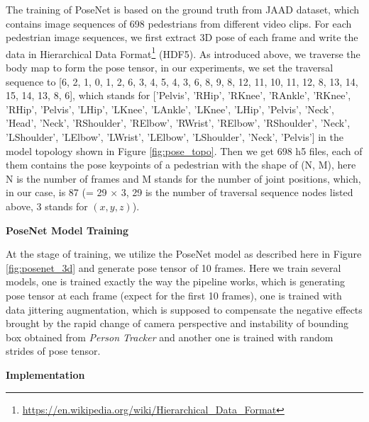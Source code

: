 The training of PoseNet is based on the ground truth from JAAD dataset, which contains image sequences of 698 pedestrians from different video clips. For each pedestrian image sequences, we first extract 3D pose of each frame and write the data in Hierarchical Data Format\footnote{\url{https://en.wikipedia.org/wiki/Hierarchical_Data_Format}} (HDF5). As introduced above, we traverse the body map to form the pose tensor, in our experiments, we set the traversal sequence to [6, 2, 1, 0, 1, 2, 6, 3, 4, 5, 4, 3, 6, 8, 9, 8, 12, 11, 10, 11, 12, 8, 13, 14, 15, 14, 13, 8, 6], which stands for ['Pelvis', 'RHip', 'RKnee', 'RAnkle', 'RKnee', 'RHip', 'Pelvis', 'LHip', 'LKnee', 'LAnkle', 'LKnee', 'LHip', 'Pelvis', 'Neck', 'Head', 'Neck', 'RShoulder', 'RElbow', 'RWrist', 'RElbow', 'RShoulder',  'Neck', 'LShoulder', 'LElbow', 'LWrist', 'LElbow', 'LShoulder', 'Neck', 'Pelvis'] in the model topology shown in Figure \ref{fig:pose_topo}. Then we get 698 h5 files, each of them contains the pose keypoints of a pedestrian with the shape of (N, M), here N is the number of frames and M stands for the number of joint positions, which, in our case, is 87 (= 29 $\times$ 3, 29 is the number of traversal sequence nodes listed above, 3 stands for $(x, y, z)$). 

\textbf{PoseNet Model Training}

At the stage of training, we utilize the PoseNet model as described here in Figure \ref{fig:posenet_3d} and generate pose tensor of 10 frames. Here we train several models, one is trained exactly the way the pipeline works, which is generating pose tensor at each frame (expect for the first 10 frames), one is trained with data jittering augmentation, which is supposed to compensate the negative effects brought by the rapid change of camera perspective and instability of bounding box obtained from \textit{Person Tracker} and another one is trained with random strides of pose tensor. 

\textbf{Implementation}

